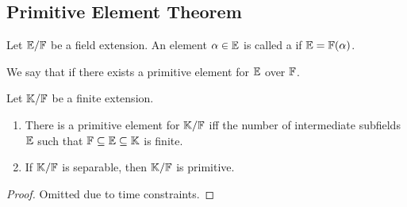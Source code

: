 \subsection{Primitive Element Theorem}

\begin{defn}
    Let $\mathbb{E}/\mathbb{F}$ be a field extension. An element $\alpha \in \mathbb{E}$ is called a  if $\mathbb{E} = \mathbb{F}(\alpha)$.
    
    We say that  if there exists a primitive element for $\mathbb{E}$ over $\mathbb{F}$.
\end{defn}

\begin{theorem} \label{thm:primitive}
    Let $\mathbb{K}/\mathbb{F}$ be a finite extension.
    \begin{enumerate}
        \item There is a primitive element for $\mathbb{K}/\mathbb{F}$ iff the number of intermediate subfields $\mathbb{E}$ such that $\mathbb{F} \subseteq \mathbb{E}\subseteq \mathbb{K}$ is finite.
        
        \item If $\mathbb{K}/\mathbb{F}$ is separable, then $\mathbb{K}/\mathbb{F}$ is primitive.
    \end{enumerate}
\end{theorem}

\begin{proof}
    Omitted due to time constraints. 
\end{proof}
